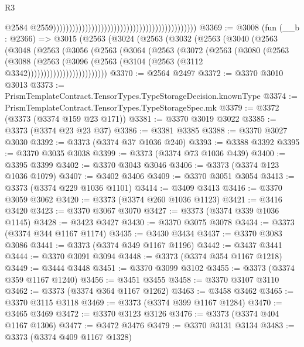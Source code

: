 \begin{lexlean}{R3}
\begin{coremodule}
                                                                                              @2584
                                                                                              @2559)))))))))))))))))))))))))))))))))))))))))))))
@3369 := @3008
    (fun (__b : @2366) =>
    @3015
      (@2563
        (@3024
          (@2563
            (@3032
              (@2563
                (@3040
                  (@2563
                    (@3048
                      (@2563
                        (@3056
                          (@2563
                            (@3064
                              (@2563
                                (@3072
                                  (@2563
                                    (@3080
                                      (@2563
                                        (@3088
                                          (@2563
                                            (@3096
                                              (@2563
                                                (@3104 (@2563 (@3112 @3342)))))))))))))))))))))))))
@3370 := @2564 @2497
@3372 := @3370 @3010 @3013
@3373 := PrismTemplateContract.TensorTypes.TypeStorageDecision.knownType
@3374 := PrismTemplateContract.TensorTypes.TypeStorageSpec.mk
@3379 := @3372 (@3373 (@3374 @159 @23 @171))
@3381 := @3370 @3019 @3022
@3385 := @3373 (@3374 @23 @23 @37)
@3386 := @3381 @3385
@3388 := @3370 @3027 @3030
@3392 := @3373 (@3374 @37 @1036 @240)
@3393 := @3388 @3392
@3395 := @3370 @3035 @3038
@3399 := @3373 (@3374 @73 @1036 @439)
@3400 := @3395 @3399
@3402 := @3370 @3043 @3046
@3406 := @3373 (@3374 @123 @1036 @1079)
@3407 := @3402 @3406
@3409 := @3370 @3051 @3054
@3413 := @3373 (@3374 @229 @1036 @1101)
@3414 := @3409 @3413
@3416 := @3370 @3059 @3062
@3420 := @3373 (@3374 @260 @1036 @1123)
@3421 := @3416 @3420
@3423 := @3370 @3067 @3070
@3427 := @3373 (@3374 @339 @1036 @1145)
@3428 := @3423 @3427
@3430 := @3370 @3075 @3078
@3434 := @3373 (@3374 @344 @1167 @1174)
@3435 := @3430 @3434
@3437 := @3370 @3083 @3086
@3441 := @3373 (@3374 @349 @1167 @1196)
@3442 := @3437 @3441
@3444 := @3370 @3091 @3094
@3448 := @3373 (@3374 @354 @1167 @1218)
@3449 := @3444 @3448
@3451 := @3370 @3099 @3102
@3455 := @3373 (@3374 @359 @1167 @1240)
@3456 := @3451 @3455
@3458 := @3370 @3107 @3110
@3462 := @3373 (@3374 @364 @1167 @1262)
@3463 := @3458 @3462
@3465 := @3370 @3115 @3118
@3469 := @3373 (@3374 @399 @1167 @1284)
@3470 := @3465 @3469
@3472 := @3370 @3123 @3126
@3476 := @3373 (@3374 @404 @1167 @1306)
@3477 := @3472 @3476
@3479 := @3370 @3131 @3134
@3483 := @3373 (@3374 @409 @1167 @1328)

\end{coremodule}
\end{lexlean}
